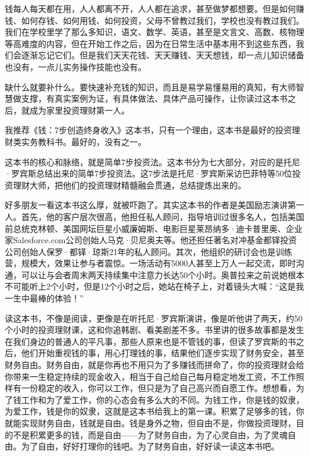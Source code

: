 

钱每人每天都在用，人人都离不开，人人都在追求，甚至做梦都想要。但是如何赚钱、如何存钱、如何用钱、如何投资，父母不曾教过我们，学校也没有教过我们。我们在学校里学了那么多知识，语文、数学、英语，甚至是文言文、高数、核物理等高难度的内容，但在开始工作之后，因为在日常生活中基本用不到这些东西，我们会逐渐忘记它们。但是我们天天花钱、天天赚钱、天天想钱，却一点儿知识储备也没有，一点儿实务操作技能也没有。

缺什么就要补什么。要快速补充钱的知识，而且是易学易懂易用的真知，有大师智慧做支撑，有真实案例为证，有具体做法、具体产品可操作，让你读过这本书之后，就成为家里投资理财第一人。

我推荐《钱：7步创造终身收入》这本书，只有一个理由，这本书是最好的投资理财类实务教科书。最好的，没有之一。

这本书的核心和脉络，就是简单7步投资法。这本书分为七大部分，对应的是托尼·罗宾斯总结出来的简单7步投资法。这7步法是托尼·罗宾斯采访巴菲特等50位投资理财大师，把他们的投资理财精髓融会贯通，总结提炼出来的。

好多朋友一看这本书这么厚，就被吓跑了。其实这本书的作者是美国励志演讲第一人。首先，他的客户层次很高，他担任私人顾问，指导培训过很多名人，包括美国前总统克林顿、美国网坛巨星小威廉姆斯、电影巨星莱昂纳多·迪卡普里奥、企业家Salesforce.com公司创始人马克·贝尼奥夫等。他还担任著名对冲基金都铎投资公司创始人保罗·都铎·琼斯21年的私人顾问。其次，他组织的研讨会也是训练营，规模大，效果让参与者震惊。一场活动有5000人甚至上万人一起交流，即时沟通，可以让与会者周末两天持续集中注意力长达50个小时。奥普拉来之前说她根本不可能听上2个小时，但是12个小时之后，她站在椅子上，对着镜头大喊：“这是我一生中最棒的体验！”

读这本书，不像是阅读，更像是在听托尼·罗宾斯演讲，像是听他讲了两天，约50个小时的投资理财课，这和你追韩剧、看美剧差不多。书里讲的很多故事都是发生在我们身边的普通人的平凡事，那些人原来也是不管钱的事，但读了罗宾斯的书之后，他们开始重视钱的事，用心打理钱的事，结果他们逐步实现了财务安全，甚至财务自由。财务自由，就是你再也不用只为了多赚钱而拼命了，你的投资理财会给你带来一生稳定持续的现金收入，相当于自己给自己每月稳定地发工资，不工作照样有一份稳定的收入，你可以工作，但只是为了自己高兴而自愿工作。想想看，为了钱工作和为了爱工作，你的心态会有多么大的不同。为钱工作，你是钱的奴隶，为爱工作，钱是你的奴隶，这就是这本书给我上的第一课。积累了足够多的钱，你就能实现财务自由，钱就是自由。钱是身外之物，但自由不是，你做投资理财，目的不是积累更多的钱，而是自由——为了财务自由，为了心灵自由，为了灵魂自由。为了自由，好好打理你的钱吧。为了财务自由，好好读一读这本书吧。

